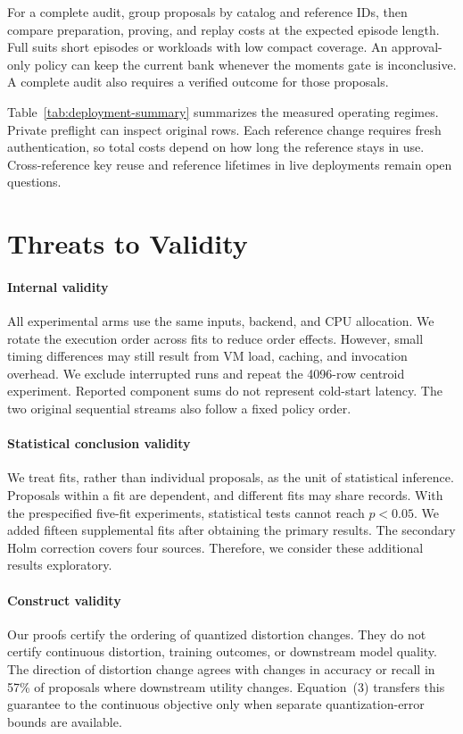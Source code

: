\documentclass[5p,times,twocolumn]{elsarticle}
\begin{document}
For a complete audit, group proposals by catalog and reference IDs, then compare preparation, proving, and replay costs at the expected episode length. Full suits short episodes or workloads with low compact coverage. An approval-only policy can keep the current bank whenever the moments gate is inconclusive. A complete audit also requires a verified outcome for those proposals.

Table~\ref{tab:deployment-summary} summarizes the measured operating regimes. Private preflight can inspect original rows. Each reference change requires fresh authentication, so total costs depend on how long the reference stays in use. Cross-reference key reuse and reference lifetimes in live deployments remain open questions.

\FloatBarrier


\section{Threats to Validity}

\paragraph{Internal validity}
All experimental arms use the same inputs, backend, and CPU allocation. We rotate the execution order across fits to reduce order effects. However, small timing differences may still result from VM load, caching, and invocation overhead. We exclude interrupted runs and repeat the 4096-row centroid experiment. Reported component sums do not represent cold-start latency. The two original sequential streams also follow a fixed policy order.

\paragraph{Statistical conclusion validity}
We treat fits, rather than individual proposals, as the unit of statistical inference. Proposals within a fit are dependent, and different fits may share records. With the prespecified five-fit experiments, statistical tests cannot reach $p<0.05$. We added fifteen supplemental fits after obtaining the primary results. The secondary Holm correction covers four sources. Therefore, we consider these additional results exploratory.

\paragraph{Construct validity}
Our proofs certify the ordering of quantized distortion changes. They do not certify continuous distortion, training outcomes, or downstream model quality. The direction of distortion change agrees with changes in accuracy or recall in 57\% of proposals where downstream utility changes. Equation~(3) transfers this guarantee to the continuous objective only when separate quantization-error bounds are available.
\end{document}
